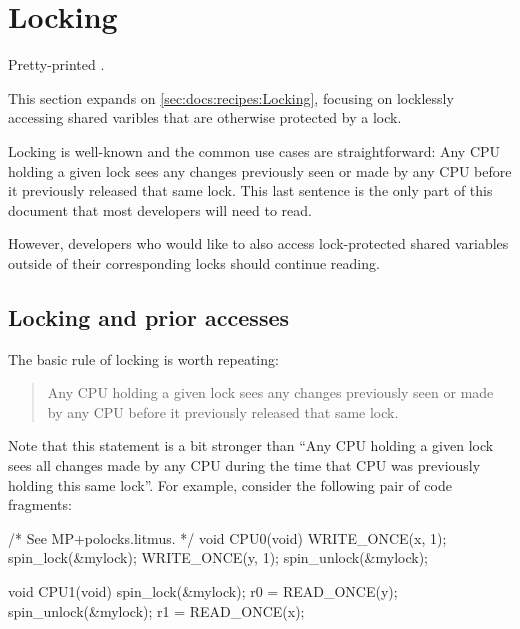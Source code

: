 \section{Locking}
\label{sec:docs:Locking}

\begin{Note}
  Pretty-printed .
\end{Note}

\begin{Note}
  This section expands on
  \cref{sec:docs:recipes:Locking},
  focusing on locklessly accessing shared varibles that are
  otherwise protected by a lock.
\end{Note}

Locking is well-known and the common use cases are straightforward:
Any CPU holding a given lock sees any changes previously seen or made by any
CPU before it previously released that same lock.
This last sentence is the only part of this document that most developers
will need to read.

However, developers who would like to also access lock-protected shared
variables outside of their corresponding locks should continue reading.


\subsection{Locking and prior accesses}

The basic rule of locking is worth repeating:

\begin{quote}
	Any CPU holding a given lock sees any changes previously seen
	or made by any CPU before it previously released that same lock.
\end{quote}

Note that this statement is a bit stronger than ``Any CPU holding a
given lock sees all changes made by any CPU during the time that CPU was
previously holding this same lock''.
For example, consider the following pair of code fragments:

\begin{VerbatimU}
	/* See MP+polocks.litmus. */
	void CPU0(void)
	{
		WRITE_ONCE(x, 1);
		spin_lock(&mylock);
		WRITE_ONCE(y, 1);
		spin_unlock(&mylock);
	}

	void CPU1(void)
	{
		spin_lock(&mylock);
		r0 = READ_ONCE(y);
		spin_unlock(&mylock);
		r1 = READ_ONCE(x);
	}
\end{VerbatimU}

